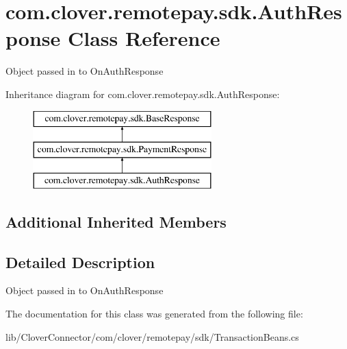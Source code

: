 \hypertarget{classcom_1_1clover_1_1remotepay_1_1sdk_1_1_auth_response}{}\section{com.\+clover.\+remotepay.\+sdk.\+Auth\+Response Class Reference}
\label{classcom_1_1clover_1_1remotepay_1_1sdk_1_1_auth_response}


Object passed in to On\+Auth\+Response  


Inheritance diagram for com.\+clover.\+remotepay.\+sdk.\+Auth\+Response\+:\begin{figure}[H]
\begin{center}
\leavevmode
\includegraphics[height=3.000000cm]{classcom_1_1clover_1_1remotepay_1_1sdk_1_1_auth_response}
\end{center}
\end{figure}
\subsection*{Additional Inherited Members}


\subsection{Detailed Description}
Object passed in to On\+Auth\+Response 



The documentation for this class was generated from the following file\+:\begin{DoxyCompactItemize}
\item 
lib/\+Clover\+Connector/com/clover/remotepay/sdk/Transaction\+Beans.\+cs\end{DoxyCompactItemize}
